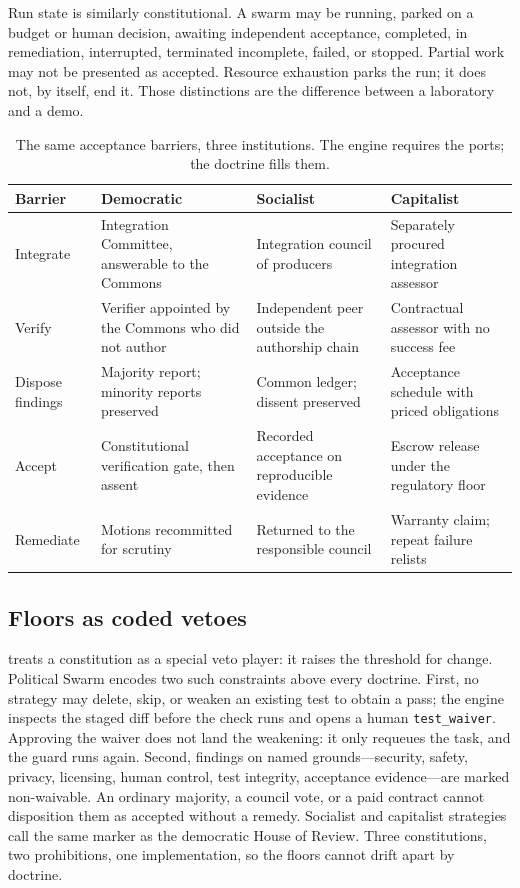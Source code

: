 \documentclass[11pt,a4paper]{article}
\begin{document}
Run state is similarly constitutional. A swarm may be running, parked on a budget or
human decision, awaiting independent acceptance, completed, in remediation, interrupted,
terminated incomplete, failed, or stopped. Partial work may not be presented as
accepted. Resource exhaustion parks the run; it does not, by itself, end it. Those
distinctions are the difference between a laboratory and a demo.

\begin{table}[t]
\centering
\caption{The same acceptance barriers, three institutions. The engine requires the
ports; the doctrine fills them.}
\label{tab:barriers}
\begin{tabular}{@{}p{2.3cm}p{3.5cm}p{3.5cm}p{3.5cm}@{}}
\toprule
Barrier & Democratic & Socialist & Capitalist \\
\midrule
Integrate &
Integration Committee, answerable to the Commons &
Integration council of producers &
Separately procured integration assessor \\
Verify &
Verifier appointed by the Commons who did not author &
Independent peer outside the authorship chain &
Contractual assessor with no success fee \\
Dispose findings &
Majority report; minority reports preserved &
Common ledger; dissent preserved &
Acceptance schedule with priced obligations \\
Accept &
Constitutional verification gate, then assent &
Recorded acceptance on reproducible evidence &
Escrow release under the regulatory floor \\
Remediate &
Motions recommitted for scrutiny &
Returned to the responsible council &
Warranty claim; repeat failure relists \\
\bottomrule
\end{tabular}
\end{table}

\subsection{Floors as coded vetoes}

\citet{tsebelis2002} treats a constitution as a special veto player: it raises the
threshold for change. Political Swarm encodes two such constraints above every doctrine.
First, no strategy may delete, skip, or weaken an existing test to obtain a pass; the
engine inspects the staged diff before the check runs and opens a human
\texttt{test\_waiver}. Approving the waiver does not land the weakening: it only requeues
the task, and the guard runs again. Second, findings on named grounds---security, safety,
privacy, licensing, human control, test integrity, acceptance evidence---are marked
non-waivable. An ordinary majority, a council vote, or a paid contract cannot
disposition them as accepted without a remedy. Socialist and capitalist strategies call
the same marker as the democratic House of Review. Three constitutions, two prohibitions,
one implementation, so the floors cannot drift apart by doctrine.
\end{document}
